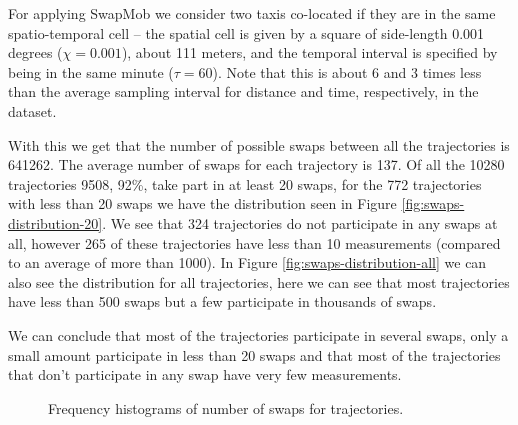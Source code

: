 \documentclass{llncs}
\begin{document}
For applying SwapMob we consider two taxis co-located if they are in
the same spatio-temporal cell -- the spatial cell is given by a square of side-length 0.001 degrees ($\chi = 0.001$), about 111
meters, and the temporal interval is specified by being in the same minute ($\tau = 60$). 
Note that this is about 6 and 3 times less than the average sampling interval for distance and time, respectively, 
in the dataset.

With this we get that the number of possible swaps between all the
trajectories is 641262. The average number of swaps for each
trajectory is 137. Of all the 10280 trajectories 9508, 92\%, take part
in at least 20 swaps, for the 772 trajectories with less than 20 swaps
we have the distribution seen in Figure
\ref{fig:swaps-distribution-20}. We see that 324 trajectories do not
participate in any swaps at all, however 265 of these trajectories
have less than 10 measurements (compared to an average of more than
1000). In Figure \ref{fig:swaps-distribution-all} we can also see the
distribution for all trajectories, here we can see that most
trajectories have less than 500 swaps but a few participate in
thousands of swaps.

We can conclude that most of the trajectories participate in several
swaps, only a small amount participate in less than 20 swaps and that
most of the trajectories that don't participate in any swap have very
few measurements.

\begin{figure}
  \hfil
  \caption{Frequency histograms of number of swaps for trajectories.}
  \label{fig:swaps-distribution}
\end{figure}
\end{document}
